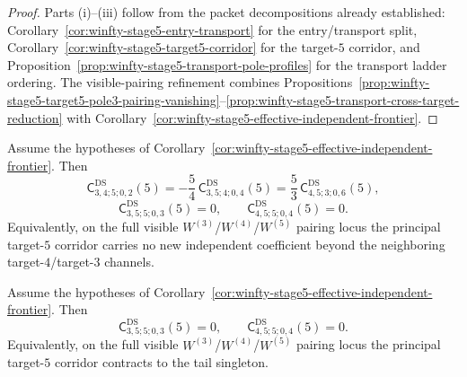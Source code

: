 \begin{proof}
Parts \textup{(i)}--\textup{(iii)} follow from the packet decompositions already established:
Corollary~\ref{cor:winfty-stage5-entry-transport} for the entry/transport split,
Corollary~\ref{cor:winfty-stage5-target5-corridor} for the target-$5$ corridor,
and Proposition~\ref{prop:winfty-stage5-transport-pole-profiles} for the transport ladder ordering.
The visible-pairing refinement combines
Propositions~\ref{prop:winfty-stage5-target5-pole3-pairing-vanishing}--\ref{prop:winfty-stage5-transport-cross-target-reduction}
with Corollary~\ref{cor:winfty-stage5-effective-independent-frontier}.
\end{proof}

\begin{conjecture}
\label{conj:winfty-stage5-principal-target5-no-new-independent-data}
\ClaimStatusConjectured{}
Assume the hypotheses of
Corollary~\ref{cor:winfty-stage5-effective-independent-frontier}.  Then
\[
\mathsf{C}^{\mathrm{DS}}_{3,4;5;0,2}(5)
=
-\frac{5}{4}\,\mathsf{C}^{\mathrm{DS}}_{3,5;4;0,4}(5)
=
\frac{5}{3}\,\mathsf{C}^{\mathrm{DS}}_{4,5;3;0,6}(5),
\]
\[
\mathsf{C}^{\mathrm{DS}}_{3,5;5;0,3}(5)=0,
\qquad
\mathsf{C}^{\mathrm{DS}}_{4,5;5;0,4}(5)=0.
\]
Equivalently, on the full visible
\texorpdfstring{$W^{(3)}$}{W3}/\texorpdfstring{$W^{(4)}$}{W4}/\texorpdfstring{$W^{(5)}$}{W5}
pairing locus the principal target-$5$ corridor carries no new
independent coefficient beyond the neighboring target-$4$/target-$3$
channels.
\end{conjecture}

\begin{conjecture}
\label{conj:winfty-stage5-principal-target5-transport-vanishing}
\ClaimStatusConjectured{}
Assume the hypotheses of
Corollary~\ref{cor:winfty-stage5-effective-independent-frontier}.  Then
\[
\mathsf{C}^{\mathrm{DS}}_{3,5;5;0,3}(5)=0,
\qquad
\mathsf{C}^{\mathrm{DS}}_{4,5;5;0,4}(5)=0.
\]
Equivalently, on the full visible
\texorpdfstring{$W^{(3)}$}{W3}/\texorpdfstring{$W^{(4)}$}{W4}/\texorpdfstring{$W^{(5)}$}{W5}
pairing locus the principal target-$5$ corridor contracts to the tail
singleton.
\end{conjecture}

